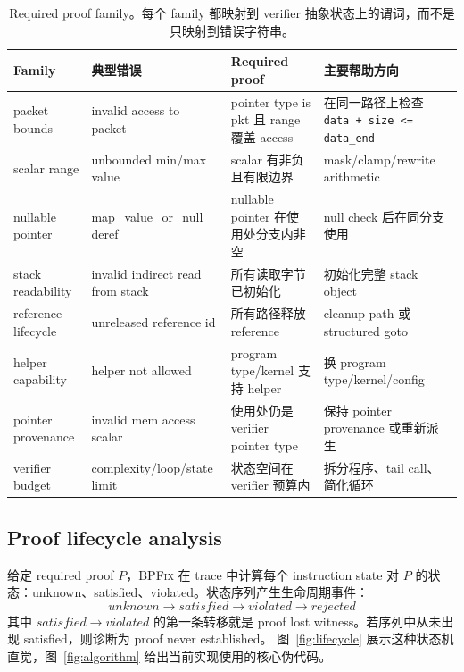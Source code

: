 \documentclass[letterpaper,twocolumn,10pt]{article}
\newcommand{\sys}{\textsc{BPFix}\xspace}
\newcommand{\code}[1]{\texttt{#1}}
\begin{document}
\begin{table}[t]
\centering
\small
\caption{Required proof family。每个 family 都映射到 verifier 抽象状态上的谓词，而不是只映射到错误字符串。}
\label{tab:proof-families}
\begin{tabularx}{\textwidth}{@{}l l X X@{}}
\toprule
Family & 典型错误 & Required proof & 主要帮助方向 \\
\midrule
packet bounds & invalid access to packet & pointer type is pkt 且 range 覆盖 access & 在同一路径上检查 \code{data + size <= data\_end} \\
scalar range & unbounded min/max value & scalar 有非负且有限边界 & mask/clamp/rewrite arithmetic \\
nullable pointer & map\_value\_or\_null deref & nullable pointer 在使用处分支内非空 & null check 后在同分支使用 \\
stack readability & invalid indirect read from stack & 所有读取字节已初始化 & 初始化完整 stack object \\
reference lifecycle & unreleased reference id & 所有路径释放 reference & cleanup path 或 structured goto \\
helper capability & helper not allowed & program type/kernel 支持 helper & 换 program type/kernel/config \\
pointer provenance & invalid mem access scalar & 使用处仍是 verifier pointer type & 保持 pointer provenance 或重新派生 \\
verifier budget & complexity/loop/state limit & 状态空间在 verifier 预算内 & 拆分程序、tail call、简化循环 \\
\bottomrule
\end{tabularx}
\end{table}

\subsection{Proof lifecycle analysis}

给定 required proof \(P\)，\sys 在 trace 中计算每个 instruction state 对 \(P\) 的状态：unknown、satisfied、violated。状态序列产生生命周期事件：
\[
unknown \rightarrow satisfied \rightarrow violated \rightarrow rejected
\]
其中 \(satisfied \rightarrow violated\) 的第一条转移就是 proof lost witness。若序列中从未出现 satisfied，则诊断为 proof never established。
图~\ref{fig:lifecycle} 展示这种状态机直觉，图~\ref{fig:algorithm} 给出当前实现使用的核心伪代码。
\end{document}

